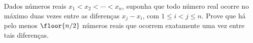 Dados números reais $x_1 < x_2 < \cdots < x_n$, suponha que todo número real ocorre no máximo duas vezes entre as diferenças $x_j - x_i$, com $1 \le i < j \le n$.
Prove que há pelo menos $\floor{n/2}$ números reais que ocorrem exatamente uma vez entre tais diferenças.

